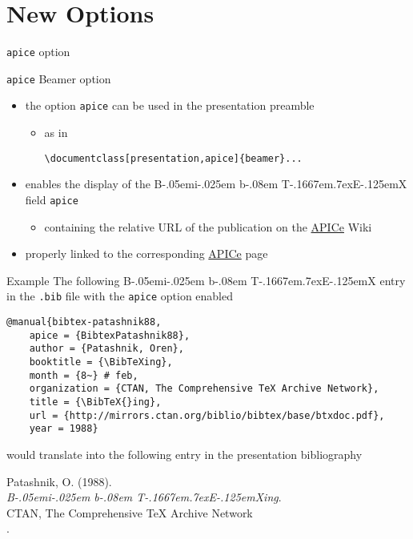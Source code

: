 \documentclass[presentation,apice]{beamer}\mode<presentation>{\usetheme{AMSBolognaFC}}
\def\BibTeX{{\rm B\kern-.05em{\sc i\kern-.025em b}\kern-.08em
    T\kern-.1667em\lower.7ex\hbox{E}\kern-.125emX}}
\begin{document}
\section{New Options}

\begin{frame}{\texttt{apice} option}
%
\begin{alertblock}{\texttt{apice} Beamer option}
\begin{itemize}
	\item the option \texttt{apice} can be used in the presentation preamble
	\begin{itemize}
		\item as in
		\begin{verbatim}
\documentclass[presentation,apice]{beamer}...
		\end{verbatim}
	\end{itemize}
	\item enables the display of the \BibTeX{} field \texttt{apice}
	\begin{itemize}
		\item containing the relative URL of the publication on the \alert{\href{http://apice.unibo.it/}{\textsf{APICe}}} Wiki
	\end{itemize}
	\item properly linked to the corresponding \href{http://apice.unibo.it/}{\textsf{APICe}} page
\end{itemize}
\end{alertblock}
%
\begin{exampleblock}{Example}
%
The following \BibTeX{} entry in the \texttt{.bib} file with the \texttt{apice} option enabled
%
{\tiny\begin{verbatim}
@manual{bibtex-patashnik88,
    apice = {BibtexPatashnik88},
    author = {Patashnik, Oren},
    booktitle = {\BibTeXing},
    month = {8~} # feb,
    organization = {CTAN, The Comprehensive TeX Archive Network},
    title = {\BibTeX{}ing},
    url = {http://mirrors.ctan.org/biblio/bibtex/base/btxdoc.pdf},
    year = 1988}
\end{verbatim}}
%
would translate into the following entry in the presentation bibliography
%
\begin{thebibliography}{}
Patashnik, O. (1988).
\\[-0.1em] {\em \BibTeX{}ing}.
\\[-0.0em] CTAN, The Comprehensive TeX Archive Network
\\[-0.4em]  .
\end{thebibliography}
%
\end{exampleblock}
%
\end{frame}
\end{document}
